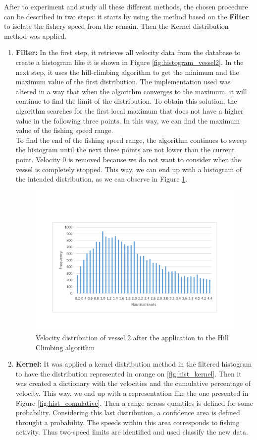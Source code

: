 After to experiment and study all these different methods, the chosen procedure can be described in two steps: it starts by using the method based on the \textbf{Filter} to isolate the fishery speed from the remain. Then the Kernel distribution method was applied.
\begin{enumerate}
\item \textbf{Filter:} In the first step, it retrieves all velocity data from the database to create a histogram like it is shown in Figure \ref{fig:histogram_vessel2}. In the next step, it uses the hill-climbing algorithm to get the minimum and the maximum value of the first distribution. 
The implementation used was altered in a way that when the algorithm converges to the maximum, it will continue to find the limit of the distribution.
To obtain this solution, the algorithm searches for the first local maximum that does not have a higher value in the following three points. In this way, we can find the maximum value of the fishing speed range. \\
To find the end of the fishing speed range, the algorithm continues to sweep the histogram until the next three points are not lower than the current point.
Velocity 0 is removed because we do not want to consider when the vessel is completely stopped. 
This way, we can end up with a histogram of the intended distribution, as we can observe in Figure \ref{fig:sog_hill_climbing}.

\begin{figure}[H]
\centering
\includegraphics[trim=0 50 0 50,width=0.8\linewidth]{Chapters/img/sog_hill_climbing.pdf}
\caption{Velocity distribution of vessel 2 after the application to the Hill Climbing algorithm}
\label{fig:sog_hill_climbing}
\end{figure}


\item \textbf{Kernel:} It was applied a kernel distribution method in the filtered histogram to have the distribution represented in orange on \ref{fig:hist_kernel}. Then it was created a dictionary with the velocities and the cumulative percentage of velocity. This way, we end up with a representation like the one presented in Figure \ref{fig:hist_comulative}. 
Then a range across quantiles is defined for some probability. Considering this last distribution, a confidence area is defined throught a probability. The speeds within this area corresponds to fishing activity. Thus two-speed limits are identified and used classify the new data.


\end{enumerate}
